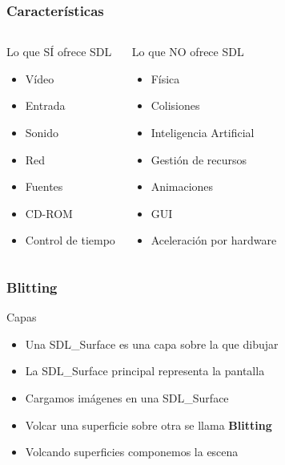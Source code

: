 \begin{frame}
    \frametitle{Características}
    
    
    \begin{columns}[c]
		\column{160pt}
		\begin{block}{Lo que SÍ ofrece SDL}
            \begin{itemize}
                \item Vídeo
                \item Entrada
                \item Sonido
                \item Red
                \item Fuentes
                \item CD-ROM
                \item Control de tiempo
            \end{itemize}            
        \end{block}
        
		\column{160pt}
        
        \begin{alertblock}{Lo que NO ofrece SDL}
            \begin{itemize}
                \item Física
                \item Colisiones
                \item Inteligencia Artificial
                \item Gestión de recursos
                \item Animaciones
                \item GUI
                \item Aceleración por hardware
            \end{itemize}            
        \end{alertblock}
		
	\end{columns} 
\end{frame}


\begin{frame}
    \frametitle{Blitting}
    
    
    \begin{block}{Capas}
        \begin{itemize}
            \item Una SDL\_Surface es una capa sobre la que dibujar
            \item La SDL\_Surface principal representa la pantalla
            \item Cargamos imágenes en una SDL\_Surface
            \item Volcar una superficie sobre otra se llama \textbf{Blitting}
            \item Volcando superficies componemos la escena
        \end{itemize}            
    \end{block}

\end{frame}


